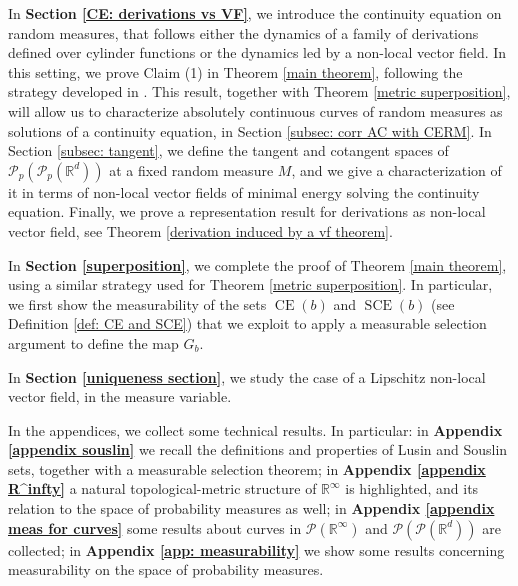 \documentclass[10pt,leqno]{amsart}
\numberwithin{equation}{section}
\newcommand{\R}{\mathbb{R}}
\newcommand{\PP}{\mathcal{P}}
\begin{document}
In \textbf{Section \ref{CE: derivations vs VF}}, we introduce the continuity equation on random measures, that follows either the dynamics of a family of derivations defined over cylinder functions or the dynamics led by a non-local vector field. In this setting, we prove Claim (1) in Theorem \ref{main theorem}, following the strategy developed in \cite{ambrosio2014well}. This result, together with Theorem \ref{metric superposition}, will allow us to characterize absolutely continuous curves of random measures as solutions of a continuity equation, in Section \ref{subsec: corr AC with CERM}.
In Section \ref{subsec: tangent}, we define the tangent and cotangent spaces of $\PP_p(\PP_p(\R^d))$ at a fixed random measure $M$, and we give a characterization of it in terms of non-local vector fields of minimal energy solving the continuity equation. Finally, we prove a representation result for derivations as non-local vector field, see Theorem \ref{derivation induced by a vf theorem}.

In \textbf{Section \ref{superposition}}, we complete the proof of Theorem \ref{main theorem}, using a similar strategy used for Theorem \ref{metric superposition}. In particular, we first show the measurability of the sets $\operatorname{CE}(b)$ and $\operatorname{SCE}(b)$ (see Definition \ref{def: CE and SCE}) that we exploit to apply a measurable selection argument to define the map $G_b$. 

In \textbf{Section \ref{uniqueness section}}, we study the case of a Lipschitz non-local vector field, in the measure variable. 

In the appendices, we collect some technical results. In particular: in \textbf{Appendix \ref{appendix souslin}} we recall the definitions and properties of Lusin and Souslin sets, together with a measurable selection theorem; in \textbf{Appendix \ref{appendix R^infty}} a natural topological-metric structure of $\R^\infty$ is highlighted, and its relation to the space of probability measures as well; in \textbf{Appendix \ref{appendix meas for curves}} some results about curves in $\PP(\R^\infty)$ and $\PP(\PP(\R^d))$ are collected;
in \textbf{Appendix \ref{app: measurability}} we show some results concerning measurability on the space of probability measures. 
\end{document}
